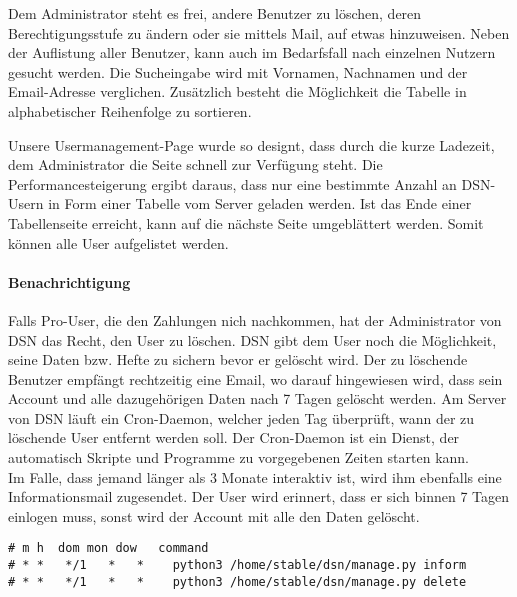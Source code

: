 Dem Administrator steht es frei, andere Benutzer zu löschen, deren Berechtigungsstufe zu ändern oder sie mittels Mail, auf etwas hinzuweisen. Neben der Auflistung aller Benutzer, kann auch im Bedarfsfall nach einzelnen Nutzern gesucht werden. Die Sucheingabe wird mit Vornamen, Nachnamen und der Email-Adresse verglichen. Zusätzlich besteht die Möglichkeit die Tabelle in alphabetischer Reihenfolge zu sortieren.


Unsere Usermanagement-Page wurde so designt, dass durch die kurze Ladezeit, dem Administrator die Seite schnell zur Verfügung steht. Die Performancesteigerung ergibt daraus, dass nur eine bestimmte Anzahl an DSN-Usern in Form einer Tabelle vom Server geladen werden. Ist das Ende einer Tabellenseite erreicht, kann auf die nächste Seite umgeblättert werden. Somit können alle User aufgelistet werden.

\paragraph{Benachrichtigung}
Falls Pro-User, die den Zahlungen nich nachkommen, hat der Administrator von DSN das Recht, den User zu löschen. DSN gibt dem User noch die Möglichkeit, seine Daten bzw. Hefte zu sichern bevor er gelöscht wird. Der zu löschende Benutzer empfängt rechtzeitig eine Email, wo darauf hingewiesen wird, dass sein Account und alle dazugehörigen Daten nach 7 Tagen gelöscht werden. Am Server von DSN läuft ein Cron-Daemon, welcher jeden Tag überprüft, wann der zu löschende User entfernt werden soll. \grqq{}Der Cron-Daemon ist ein Dienst, der automatisch Skripte und Programme zu vorgegebenen Zeiten starten kann.\grqq{}\cite{CRON}\\
Im Falle, dass jemand länger als 3 Monate interaktiv ist, wird ihm ebenfalls eine Informationsmail zugesendet. Der User wird erinnert, dass er sich binnen 7 Tagen einlogen muss, sonst wird der Account mit alle den Daten gelöscht. \cite{COMMANDS}\cite{CRON}

\begin{lstlisting}[caption={Cronjob für die {\"U}berpr{\"u}fung der Inaktivt{\"a}t und L{\"o}schung}]
# m h  dom mon dow   command
# * *   */1   *   *    python3 /home/stable/dsn/manage.py inform
# * *   */1   *   *    python3 /home/stable/dsn/manage.py delete
\end{lstlisting}
